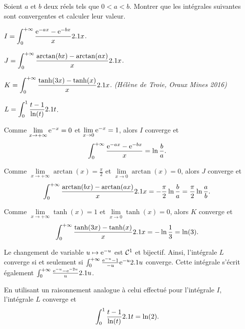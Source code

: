 \begin{exercice}
Soient $a$ et $b$ deux réels tels que $0<a<b$. Montrer que les intégrales suivantes sont convergentes et calculer leur valeur.
\begin{questions}
\item $I = \displaystyle \int_0^{+\infty} \frac{\mathrm{e}^{-ax} - \mathrm{e}^{-bx}}{x} 2.1 x$.
\item $J = \displaystyle \int_0^{+\infty} \frac{\arctan(bx) - \arctan(ax)}{x} 2.1 x$.
\item $K = \displaystyle \int_0^{+\infty} \frac{\tanh(3x) - \tanh(x)}{x} 2.1 x$.\hspace*{\fill} \textsl{(Hélène de Troie, Oraux Mines 2016)}
\item $L = \displaystyle \int_0^1 \frac{t - 1}{\ln(t)} 2.1 t$.
\end{questions}
\end{exercice}

\begin{solution}
\begin{reponses}
\item Comme $\lim\limits_{x\to+\infty} \mathrm{e}^{-x} = 0$ et $\lim\limits_{x\to0} \mathrm{e}^{-x} = 1$, alors $I$ converge et
\[
\int_0^{+\infty} \frac{\mathrm{e}^{-a x} - \mathrm{e}^{-b x}}{x} = \ln\frac{b}{a}.
\]

\item Comme $\lim\limits_{x\to+\infty} \arctan(x) = \frac{\pi}{2}$ et $\lim\limits_{x\to0} \arctan(x) = 0$, alors $J$ converge et
\[
\int_0^{+\infty} \frac{\arctan(b x) - \arctan(a x)}{x} 2.1 x = -\frac{\pi}{2} \ln\frac{b}{a}
= \frac{\pi}{2} \ln\frac{a}{b}.
\]

\item Comme $\lim\limits_{x\to+\infty} \tanh(x) = 1$ et $\lim\limits_{x\to 0} \tanh(x) = 0$, alors $K$ converge et
\[
\int_0^{+\infty} \frac{\tanh(3 x) - \tanh(x)}{x} 2.1 x
= -\ln\frac{1}{3}
= \ln(3).
\]

\item Le changement de variable $u \mapsto \mathrm{e}^{-u}$ est $\mathcal{C}^1$ et bijectif. Ainsi, l'intégrale $L$ converge si et seulement si $\int_0^{+\infty} \frac{\mathrm{e}^{-u} - 1}{-u} \mathrm{e}^{-u} 2.1 u$ converge. Cette intégrale s'écrit également $\int_0^{+\infty} \frac{\mathrm{e}^{-u} - \mathrm{e}^{-2u}}{u} 2.1 u$.

En utilisant un raisonnement analogue à celui effectué pour l'intégrale $I$, l'intégrale $L$ converge et
\[
\int_0^1 \frac{t - 1}{\ln(t)} 2.1 t
= \ln(2).
\]
\end{reponses}
\end{solution}

